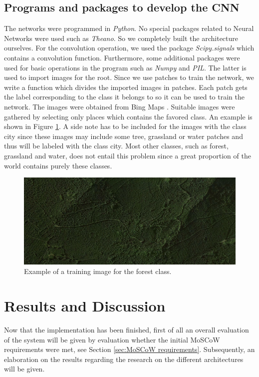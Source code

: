 \documentclass[a4paper,onecolumn]{report}
\begin{document}
\section{Programs and packages to develop the CNN}
The networks were programmed in \textit{Python}. No special packages related to Neural Networks were used such as \textit{Theano}.  So we completely built the architecture ourselves. For the convolution operation, we used the package \textit{Scipy.signals} which contains a convolution function. Furthermore, some additional packages were used for basic operations in the program such as \textit{Numpy} and \textit{PIL}. The latter is used to import images for the root. Since we use patches to train the network, we write a function which divides the imported images in patches. Each patch gets the label corresponding to the class it belongs to so it can be used to train the network. The images were obtained from Bing Maps \cite{bing}. Suitable images were gathered by selecting only places which contains the favored class. An example is shown in Figure \ref{fig:classexample}. A side note has to be included for the images with the class city since these images may include some tree, grassland or water patches and thus will be labeled with the class city. Most other classes, such as forest, grassland and water, does not entail this problem since a great proportion of the world contains purely these classes.

\begin{figure}[h!]
    \centering
    \includegraphics[scale=0.4]{./images/classexample.png}
    \caption{Example of a training image for the forest class.}
	\label{fig:classexample}
\end{figure}



\chapter{Results and Discussion}
\label{chap:resultsanddiscussion}
Now that the implementation has been finished, first of all an overall evaluation of the system will be given by evaluation whether the initial MoSCoW requirements were met, see Section \ref{sec:MoSCoW requirements}. Subsequently, an elaboration on the results regarding the research on the different architectures will be given. 
\end{document}
